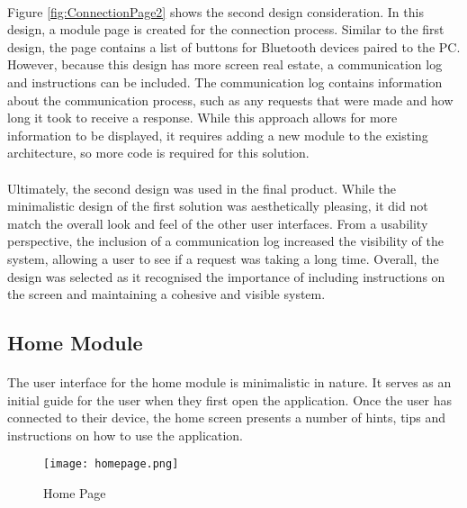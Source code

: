 {		\paragraph{}{
		Figure \ref{fig:ConnectionPage2} shows the second design consideration. In this design, a module page is created for the connection process. Similar to the first design, the page contains a list of buttons for Bluetooth devices paired to the PC. However, because this design has more screen real estate, a communication log and instructions can be included. The communication log contains information about the communication process, such as any requests that were made and how long it took to receive a response. While this approach allows for more information to be displayed, it requires adding a new module to the existing architecture, so more code is required for this solution.
		}
		
		\paragraph{}{
		Ultimately, the second design was used in the final product. While the minimalistic design of the first solution was aesthetically pleasing, it did not match the overall look and feel of the other user interfaces. From a usability perspective, the inclusion of a communication log increased the visibility of the system, allowing a user to see if a request was taking a long time. Overall, the design was selected as it recognised the importance of including instructions on the screen and maintaining a cohesive and visible system.
		}
	}
	\label{ssec:DesignConnectionModule}
	
	\subsection{Home Module}
		\paragraph{}{
		The user interface for the home module is minimalistic in nature. It serves as an initial guide for the user when they first open the application. Once the user has connected to their device, the home screen presents a number of hints, tips and instructions on how to use the application.
		}
		\begin{figure}[h]
			\begin{center}
				\texttt{[image: homepage.png]}
				\caption{Home Page}
				\label{fig:HomePage}
			\end{center}
		\end{figure}
		
